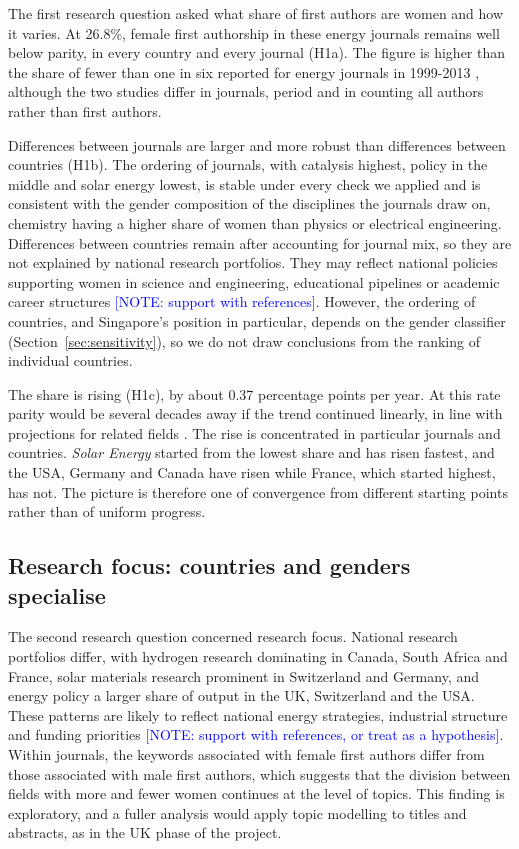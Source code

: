 \documentclass[preprint,12pt,number]{elsarticle}
\newcommand{\note}[1]{\textcolor{blue}{[NOTE: #1]}}
\begin{document}
The first research question asked what share of first authors are women and how it varies. At 26.8\%, female first authorship in these energy journals remains well below parity, in every country and every journal (H1a). The figure is higher than the share of fewer than one in six reported for energy journals in 1999-2013 \citep{Sovacool2014}, although the two studies differ in journals, period and in counting all authors rather than first authors.

Differences between journals are larger and more robust than differences between countries (H1b). The ordering of journals, with catalysis highest, policy in the middle and solar energy lowest, is stable under every check we applied and is consistent with the gender composition of the disciplines the journals draw on, chemistry having a higher share of women than physics or electrical engineering. Differences between countries remain after accounting for journal mix, so they are not explained by national research portfolios. They may reflect national policies supporting women in science and engineering, educational pipelines or academic career structures \note{support with references}. However, the ordering of countries, and Singapore's position in particular, depends on the gender classifier (Section~\ref{sec:sensitivity}), so we do not draw conclusions from the ranking of individual countries.

The share is rising (H1c), by about 0.37 percentage points per year. At this rate parity would be several decades away if the trend continued linearly, in line with projections for related fields \citep{Holman2018}. The rise is concentrated in particular journals and countries. \textit{Solar Energy} started from the lowest share and has risen fastest, and the USA, Germany and Canada have risen while France, which started highest, has not. The picture is therefore one of convergence from different starting points rather than of uniform progress.

\subsection{Research focus: countries and genders specialise}

The second research question concerned research focus. National research portfolios differ, with hydrogen research dominating in Canada, South Africa and France, solar materials research prominent in Switzerland and Germany, and energy policy a larger share of output in the UK, Switzerland and the USA. These patterns are likely to reflect national energy strategies, industrial structure and funding priorities \note{support with references, or treat as a hypothesis}. Within journals, the keywords associated with female first authors differ from those associated with male first authors, which suggests that the division between fields with more and fewer women continues at the level of topics. This finding is exploratory, and a fuller analysis would apply topic modelling to titles and abstracts, as in the UK phase of the project.
\end{document}
